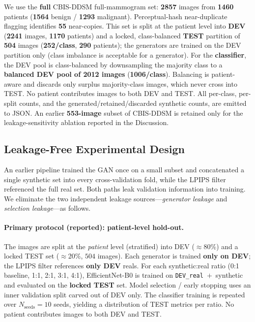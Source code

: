 \documentclass[runningheads]{llncs}
\begin{document}
We use the \textbf{full} CBIS-DDSM full-mammogram set: \textbf{2857} images from
\textbf{1460} patients (\textbf{1564} benign / \textbf{1293} malignant).
Perceptual-hash near-duplicate flagging identifies \textbf{55} near-copies. This
set is split at the patient level into \textbf{DEV} (\textbf{2241} images,
\textbf{1170} patients) and a locked, class-balanced \textbf{TEST} partition of
\textbf{504} images (\textbf{252/class}, \textbf{290} patients); the generators
are trained on the DEV partition only (class imbalance is acceptable for a
generator). For the \textbf{classifier}, the DEV pool is class-balanced by
downsampling the majority class to a \textbf{balanced DEV pool of 2012 images}
(\textbf{1006/class}). Balancing is patient-aware and discards only surplus
majority-class images, which never cross into TEST. No patient contributes images
to both DEV and TEST. All per-class, per-split counts, and the
generated/retained/discarded synthetic counts, are emitted to JSON. An earlier
\textbf{553-image} subset of CBIS-DDSM is retained only for the
leakage-sensitivity ablation reported in the Discussion.

\subsection{Leakage-Free Experimental Design}
An earlier pipeline trained the GAN once on a small subset and concatenated a
single synthetic set into every cross-validation fold, while the LPIPS filter
referenced the full real set. Both paths leak validation information into
training. We eliminate the two independent leakage sources---\emph{generator
leakage} and \emph{selection leakage}---as follows.

\paragraph{Primary protocol (reported): patient-level hold-out.}
The images are split at the \emph{patient} level (stratified) into DEV
($\approx$80\%) and a locked TEST set ($\approx$20\%, $504$ images). Each
generator is trained \textbf{only on DEV}; the LPIPS filter references
\textbf{only DEV} reals. For
each synthetic:real ratio (0:1 baseline, 1:1, 2:1, 3:1, 4:1), EfficientNet-B0 is
trained on \texttt{DEV\_real}~$+$~synthetic and evaluated on the \textbf{locked
TEST} set. Model selection / early stopping uses an inner validation split
carved out of DEV only. The classifier training is repeated over
$N_\text{seeds}{=}10$ seeds, yielding a distribution of TEST metrics per ratio.
No patient contributes images to both DEV and TEST.
\end{document}
